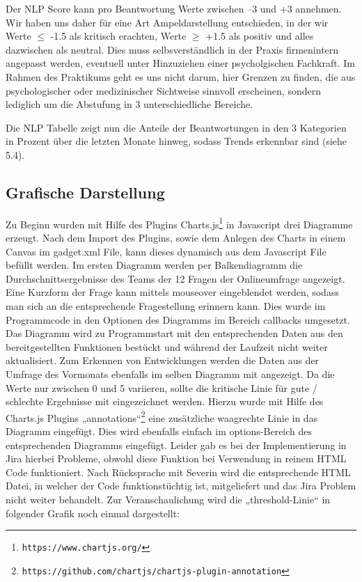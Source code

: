 \documentclass[a4paper,12pt,]{article}
\begin{document}
Der NLP Score kann pro Beantwortung Werte zwischen --3 und +3 annehmen. Wir haben uns daher für eine Art Ampeldarstellung entschieden, in der wir Werte	$\leq$ -1.5 als kritisch erachten, Werte $\geq$ +1.5 als positiv und alles dazwischen als neutral. Dies muss selbsverständlich in der Praxis firmenintern angepasst werden, eventuell unter Hinzuziehen einer psycholgischen Fachkraft. Im Rahmen des Praktikums geht es uns nicht darum, hier Grenzen zu finden, die aus psychologischer oder medizinischer Sichtweise sinnvoll erscheinen, sondern lediglich um die Abstufung in 3 unterschiedliche Bereiche.  

Die NLP Tabelle zeigt nun die Anteile der Beantwortungen in den 3 Kategorien in Prozent über die letzten Monate hinweg, sodass Trends erkennbar sind (siehe 5.4).


\subsection{Grafische Darstellung}
Zu Beginn wurden mit Hilfe des Plugins Charts.js\footnote{\tt  https://www.chartjs.org/} in Javascript drei Diagramme erzeugt.
Nach dem Import des Plugins, sowie dem Anlegen des Charts in einem Canvas im gadget.xml File, kann dieses dynamisch aus dem Javascript File befüllt werden. 
Im ersten Diagramm werden per Balkendiagramm die Durchschnittsergebnisse des Teams der 12 Fragen der Onlineumfrage angezeigt. Eine Kurzform der Frage kann mittels mouseover eingeblendet werden, sodass man sich an die entsprechende Fragestellung erinnern kann. Dies wurde im Programmcode in den Optionen des Diagramms im Bereich callbacks umgesetzt. Das Diagramm wird zu Programmstart mit den entsprechenden Daten aus den bereitgestellten Funktionen bestückt und während der Laufzeit nicht weiter aktualisiert. Zum Erkennen von Entwicklungen werden die Daten aus der  Umfrage des Vormonats ebenfalls im selben Diagramm mit angezeigt. Da die Werte nur zwischen 0 und 5 variieren, sollte die kritische Linie für gute / schlechte Ergebnisse mit eingezeichnet werden. Hierzu wurde mit Hilfe des Charts.js Plugins „annotations“\footnote{\tt https://github.com/chartjs/chartjs-plugin-annotation} eine zusätzliche waagrechte Linie in das Diagramm eingefügt. Dies wird ebenfalls einfach im options-Bereich des entsprechenden Diagramms eingefügt. Leider gab es bei der Implementierung in Jira hierbei Probleme, obwohl diese Funktion bei Verwendung in reinem HTML Code funktioniert. Nach Rücksprache mit Severin wird die entsprechende HTML Datei, in welcher der Code funktionstüchtig ist, mitgeliefert und das Jira Problem nicht weiter behandelt. Zur Veranschaulichung wird die „threshold-Linie“ in folgender Grafik noch einmal dargestellt:
\end{document}
